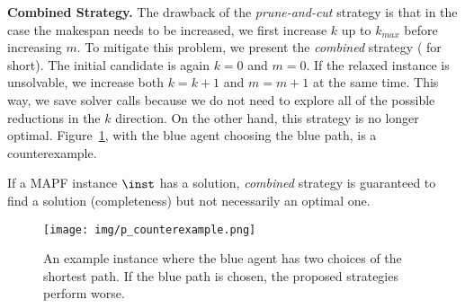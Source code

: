 \textbf{Combined Strategy.}
%
The drawback of the \emph{prune-and-cut} strategy is that in the case the makespan needs to be increased, we first increase $k$ up to $k_{max}$ before increasing $m$. To mitigate this problem, we present the \emph{combined} strategy (\ssc{} for short). The initial candidate is again $k=0$ and $m=0$. If the relaxed instance is unsolvable, we increase both $k=k+1$ and $m=m+1$ at the same time. This way, we save solver calls because we do not need to explore all of the possible reductions in the $k$ direction. On the other hand, this strategy is no longer optimal. Figure~\ref{fig:p_counterexample}, with the blue agent choosing the blue path, is a counterexample.
%
\begin{prop}\cite{AAMAS_corridors}
If a MAPF instance $\inst$ has a solution, \emph{combined} strategy is guaranteed to find a solution (completeness) but not necessarily an optimal one.
\end{prop}
%
%
\begin{figure}[ht]
\centering
\texttt{[image: img/p\_counterexample.png]}
\caption{An example instance where the blue agent has two choices of the shortest path. If the blue path is chosen, the proposed strategies perform worse.}
\label{fig:p_counterexample}
\end{figure}
%
